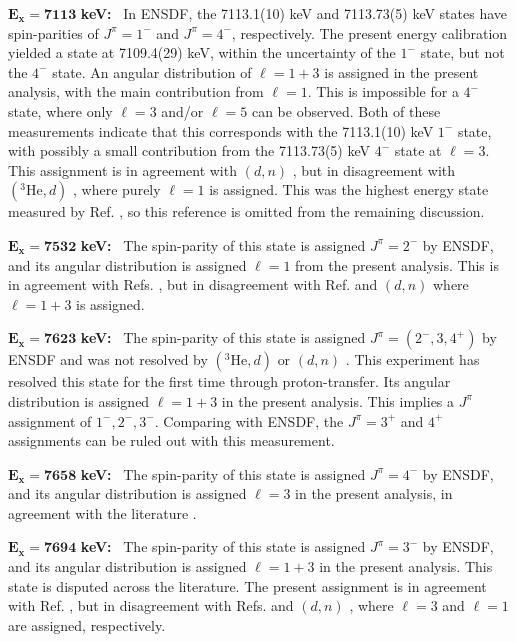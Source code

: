 \emph{$\mathbf{E_{x} = 7113}$} \textbf{keV:} \, 
In ENSDF, the 7113.1(10) keV and 7113.73(5) keV states have spin-parities of $J^{\pi} = 1^{-}$ and $J^{\pi} = 4^{-}$, respectively. The present energy calibration yielded a state at 7109.4(29) keV, within the uncertainty of the $1^{-}$ state, but not the $4^{-}$ state. An angular distribution of $\ell=1+3$ is assigned in the present analysis, with the main contribution from $\ell=1$. This is impossible for a $4^{-}$ state, where only $\ell=3$ and/or $\ell=5$ can be observed. Both of these measurements indicate that this corresponds with the 7113.1(10) keV $1^{-}$ state, with possibly a small contribution from the 7113.73(5) keV $4^{-}$ state at $\ell=3$. This assignment is in agreement with $(d,n)$ \cite{Fuchs1969}, but in disagreement with $(^{3}\mathrm{He},d)$ \cite{Erskine1966,Seth1967,Forster1970,Cage1971}, where purely $\ell=1$ is assigned. This was the highest energy state measured by Ref. \cite{Forster1970}, so this reference is omitted from the remaining discussion.

\emph{$\mathbf{E_{x} = 7532}$} \textbf{keV:} \, 
The spin-parity of this state is assigned $J^{\pi} = 2^{-}$ by ENSDF, and its angular distribution is assigned $\ell=1$ from the present analysis. This is in agreement with Refs. \cite{Erskine1966,Cage1971}, but in disagreement with Ref. \cite{Seth1967} and $(d,n)$ \cite{Fuchs1969} where $\ell=1+3$ is assigned.

\emph{$\mathbf{E_{x} = 7623}$} \textbf{keV:} \, 
The spin-parity of this state is assigned $J^{\pi} = (2^{-},3,4^{+})$ by ENSDF and was not resolved by $(^{3}\mathrm{He},d)$ \cite{Erskine1966,Seth1967,Cage1971} or $(d,n)$ \cite{Fuchs1969}. This experiment has resolved this state for the first time through proton-transfer. Its angular distribution is assigned $\ell=1+3$ in the present analysis. This implies a $J^{\pi}$ assignment of $1^{-},2^{-},3^{-}$. Comparing with ENSDF, the $J^{\pi} = 3^{+}$ and $4^{+}$ assignments can be ruled out with this measurement.

\emph{$\mathbf{E_{x} = 7658}$} \textbf{keV:} \, 
The spin-parity of this state is assigned $J^{\pi} = 4^{-}$ by ENSDF, and its angular distribution is assigned $\ell=3$ in the present analysis, in agreement with the literature \cite{Erskine1966,Seth1967,Cage1971,Fuchs1969}.

\emph{$\mathbf{E_{x} = 7694}$} \textbf{keV:} \, 
The spin-parity of this state is assigned $J^{\pi} = 3^{-}$ by ENSDF, and its angular distribution is assigned $\ell=1+3$ in the present analysis. This state is disputed across the literature. The present assignment is in agreement with Ref. \cite{Erskine1966}, but in disagreement with Refs. \cite{Seth1967,Cage1971} and $(d,n)$ \cite{Fuchs1969}, where $\ell=3$ and $\ell=1$ are assigned, respectively.


